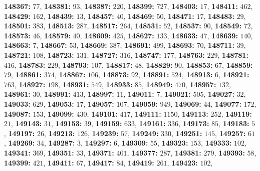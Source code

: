 \textsf{\bfseries 148367:} $77$, \textsf{\bfseries 148381:} $93$, \textsf{\bfseries 148387:} $220$, \textsf{\bfseries 148399:} $727$, \textsf{\bfseries 148403:} $17$, \textsf{\bfseries 148411:} $462$, \textsf{\bfseries 148429:} $162$, \textsf{\bfseries 148439:} $13$, \textsf{\bfseries 148457:} $40$, \textsf{\bfseries 148469:} $50$, \textsf{\bfseries 148471:} $17$, \textsf{\bfseries 148483:} $29$, \textsf{\bfseries 148501:} $383$, \textsf{\bfseries 148513:} $287$, \textsf{\bfseries 148517:} $264$, \textsf{\bfseries 148531:} $52$, \textsf{\bfseries 148537:} $90$, \textsf{\bfseries 148549:} $72$, \textsf{\bfseries 148573:} $46$, \textsf{\bfseries 148579:} $40$, \textsf{\bfseries 148609:} $425$, \textsf{\bfseries 148627:} $133$, \textsf{\bfseries 148633:} $47$, \textsf{\bfseries 148639:} $140$, \textsf{\bfseries 148663:} $7$, \textsf{\bfseries 148667:} $53$, \textsf{\bfseries 148669:} $387$, \textsf{\bfseries 148691:} $499$, \textsf{\bfseries 148693:} $70$, \textsf{\bfseries 148711:} $39$, \textsf{\bfseries 148721:} $108$, \textsf{\bfseries 148723:} $131$, \textsf{\bfseries 148727:} $316$, \textsf{\bfseries 148747:} $177$, \textsf{\bfseries 148763:} $229$, \textsf{\bfseries 148781:} $416$, \textsf{\bfseries 148783:} $229$, \textsf{\bfseries 148793:} $107$, \textsf{\bfseries 148817:} $48$, \textsf{\bfseries 148829:} $90$, \textsf{\bfseries 148853:} $67$, \textsf{\bfseries 148859:} $79$, \textsf{\bfseries 148861:} $374$, \textsf{\bfseries 148867:} $106$, \textsf{\bfseries 148873:} $92$, \textsf{\bfseries 148891:} $524$, \textsf{\bfseries 148913:} $6$, \textsf{\bfseries 148921:} $763$, \textsf{\bfseries 148927:} $198$, \textsf{\bfseries 148931:} $549$, \textsf{\bfseries 148933:} $85$, \textsf{\bfseries 148949:} $470$, \textsf{\bfseries 148957:} $132$, \textsf{\bfseries 148961:} $30$, \textsf{\bfseries 148991:} $413$, \textsf{\bfseries 148997:} $11$, \textsf{\bfseries 149011:} $7$, \textsf{\bfseries 149021:} $505$, \textsf{\bfseries 149027:} $32$, \textsf{\bfseries 149033:} $629$, \textsf{\bfseries 149053:} $17$, \textsf{\bfseries 149057:} $107$, \textsf{\bfseries 149059:} $949$, \textsf{\bfseries 149069:} $44$, \textsf{\bfseries 149077:} $172$, \textsf{\bfseries 149087:} $153$, \textsf{\bfseries 149099:} $430$, \textsf{\bfseries 149101:} $417$, \textsf{\bfseries 149111:} $1150$, \textsf{\bfseries 149113:} $252$, \textsf{\bfseries 149119:} $21$, \textsf{\bfseries 149143:} $31$, \textsf{\bfseries 149153:} $39$, \textsf{\bfseries 149159:} $633$, \textsf{\bfseries 149161:} $336$, \textsf{\bfseries 149173:} $85$, \textsf{\bfseries 149183:} $5$, \textsf{\bfseries 149197:} $26$, \textsf{\bfseries 149213:} $126$, \textsf{\bfseries 149239:} $57$, \textsf{\bfseries 149249:} $330$, \textsf{\bfseries 149251:} $145$, \textsf{\bfseries 149257:} $61$, \textsf{\bfseries 149269:} $34$, \textsf{\bfseries 149287:} $3$, \textsf{\bfseries 149297:} $6$, \textsf{\bfseries 149309:} $55$, \textsf{\bfseries 149323:} $153$, \textsf{\bfseries 149333:} $102$, \textsf{\bfseries 149341:} $369$, \textsf{\bfseries 149351:} $33$, \textsf{\bfseries 149371:} $401$, \textsf{\bfseries 149377:} $287$, \textsf{\bfseries 149381:} $279$, \textsf{\bfseries 149393:} $58$, \textsf{\bfseries 149399:} $421$, \textsf{\bfseries 149411:} $67$, \textsf{\bfseries 149417:} $84$, \textsf{\bfseries 149419:} $261$, \textsf{\bfseries 149423:} $102$, 
